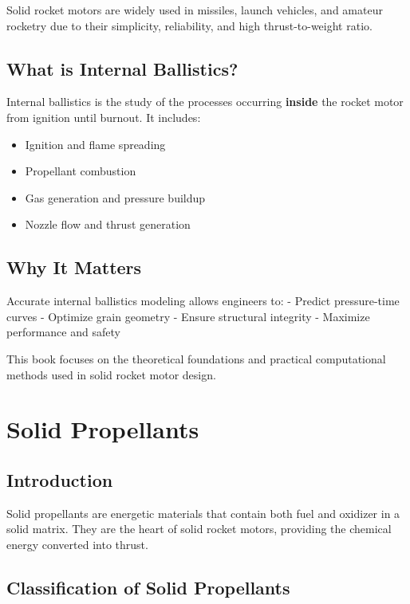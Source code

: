 \documentclass[
  letterpaper,
  DIV=11,
  numbers=noendperiod]{scrreprt}
\providecommand{\tightlist}{%
  \setlength{\itemsep}{0pt}\setlength{\parskip}{0pt}}
\begin{document}
Solid rocket motors are widely used in missiles, launch vehicles, and
amateur rocketry due to their simplicity, reliability, and high
thrust-to-weight ratio.

\section{What is Internal
Ballistics?}\label{what-is-internal-ballistics}

Internal ballistics is the study of the processes occurring
\textbf{inside} the rocket motor from ignition until burnout. It
includes:

\begin{itemize}
\tightlist
\item
  Ignition and flame spreading
\item
  Propellant combustion
\item
  Gas generation and pressure buildup
\item
  Nozzle flow and thrust generation
\end{itemize}

\section{Why It Matters}\label{why-it-matters}

Accurate internal ballistics modeling allows engineers to: - Predict
pressure-time curves - Optimize grain geometry - Ensure structural
integrity - Maximize performance and safety

This book focuses on the theoretical foundations and practical
computational methods used in solid rocket motor design.


\chapter{Solid Propellants}\label{solid-propellants}

\section{Introduction}\label{introduction}

Solid propellants are energetic materials that contain both fuel and
oxidizer in a solid matrix. They are the heart of solid rocket motors,
providing the chemical energy converted into thrust.

\section{Classification of Solid
Propellants}\label{classification-of-solid-propellants}
\end{document}
